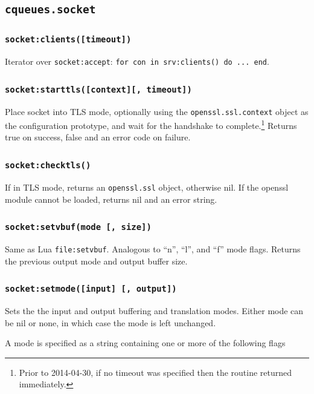\documentclass[11pt, oneside]{memoir}
\newcommand*{\fn}[1]{\texttt{#1}\xspace}
\newcommand*{\method}[1]{\texttt{#1}\xspace}
\newcommand*{\module}[1]{\texttt{#1}\xspace}
\newcounter{toccols}
\newenvironment{Module}[1]{
	\subsection{\texttt{#1}}
	\addtocontents{toc}{
		\protect\begin{multicols}{\value{toccols}}
	}
}{
	\addtocontents{toc}{\protect\end{multicols}}
}
\begin{document}
\begin{Module}{cqueues.socket}
\subsubsection[\fn{socket:clients}]{\fn{socket:clients([timeout])}}
Iterator over \method{socket:accept}: \texttt{for con in srv:clients() do ... end}.


\subsubsection[\fn{socket:starttls}]{\fn{socket:starttls([context][, timeout])}}
Place socket into TLS mode, optionally using the \module{openssl.ssl.context} object as the configuration prototype, and wait for the handshake to complete.\footnote{Prior to 2014-04-30, if no timeout was specified then the routine returned immediately.} Returns true on success, false and an error code on failure.

\subsubsection[\fn{socket:checktls}]{\fn{socket:checktls()}}

If in TLS mode, returns an \module{openssl.ssl} object, otherwise nil. If the openssl module cannot be loaded, returns nil and an error string.

\subsubsection[\fn{socket:setvbuf}]{\fn{socket:setvbuf(mode [, size])}}
Same as Lua \fn{file:setvbuf}. Analogous to ``n'', ``l'', and ``f'' mode flags. Returns the previous output mode and output buffer size.

\subsubsection[\fn{socket:setmode}]{\fn{socket:setmode([input] [, output])}}
Sets the the input and output buffering and translation modes. Either mode can be nil or none, in which case the mode is left unchanged.

A mode is specified as a string containing one or more of the following flags


\end{Module}
\end{document}
